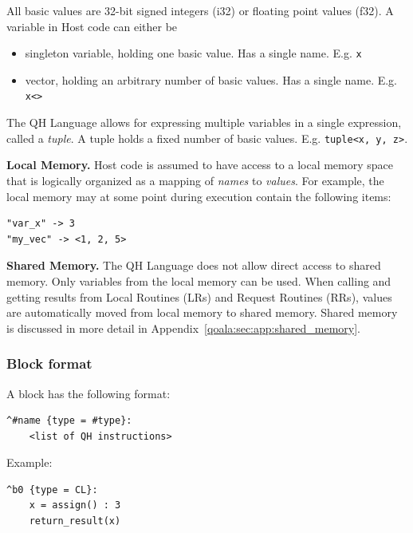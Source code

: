 All basic values are 32-bit signed integers (i32) or floating point values (f32).
A variable in Host code can either be
\begin{itemize}
\item singleton variable, holding one basic value. Has a single name. E.g. \texttt{x}
\item vector, holding an arbitrary number of basic values. Has a single name. E.g. \texttt{x<>}
\end{itemize}

The QH Language allows for expressing multiple variables in a single expression, called a \textit{tuple}.
A tuple holds a fixed number of basic values. E.g. \texttt{tuple<x, y, z>}.

\textbf{Local Memory.}
Host code is assumed to have access to a local memory space that is logically organized as a mapping of \textit{names} to \textit{values}.
For example, the local memory may at some point during execution contain the following items:

\begin{lstlisting}
"var_x" -> 3
"my_vec" -> <1, 2, 5>
\end{lstlisting}


\textbf{Shared Memory.}
The QH Language does not allow direct access to shared memory.
Only variables from the local memory can be used.
When calling and getting results from Local Routines (LRs) and Request Routines (RRs), values are automatically
moved from local memory to shared memory. 
Shared memory is discussed in more detail in Appendix~\ref{qoala:sec:app:shared_memory}.

\subsubsection{Block format}

A block has the following format:
\begin{lstlisting}
^#name {type = #type}:
    <list of QH instructions>
\end{lstlisting}

Example:
\begin{lstlisting}
^b0 {type = CL}:
    x = assign() : 3
    return_result(x)
\end{lstlisting}


